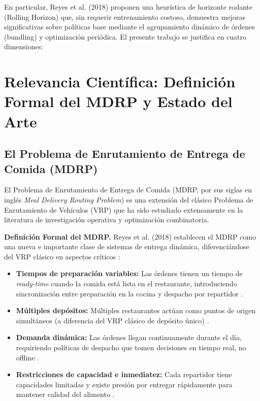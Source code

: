 En particular, Reyes et al. (2018) proponen una heurística de horizonte 
rodante (Rolling Horizon) que, sin requerir entrenamiento costoso, demuestra 
mejoras significativas sobre políticas base mediante el agrupamiento dinámico 
de órdenes (bundling) y optimización periódica. El presente trabajo se justifica 
en cuatro dimensiones:

\section{Relevancia Científica: Definición Formal del MDRP y Estado del Arte}

\subsection{El Problema de Enrutamiento de Entrega de Comida (MDRP)}

El Problema de Enrutamiento de Entrega de Comida (MDRP, por sus siglas 
en inglés \textit{Meal Delivery Routing Problem}) es una extensión del 
clásico Problema de Enrutamiento de Vehículos (VRP) que ha sido estudiado 
extensamente en la literatura de investigación operativa y optimización 
combinatoria.

\textbf{Definición Formal del MDRP.} Reyes et al. (2018) establecen el 
MDRP como una nueva e importante clase de sistemas de entrega dinámica, 
diferenciándose del VRP clásico en aspectos críticos \cite{Reyes2018}:

\begin{itemize}
    \item \textbf{Tiempos de preparación variables:} Las órdenes tienen un 
    tiempo de \textit{ready-time} cuando la comida está lista en el restaurante, 
    introduciendo sincronización entre preparación en la cocina y despacho 
    por repartidor \cite{Reyes2018}.
    
    \item \textbf{Múltiples depósitos:} Múltiples restaurantes actúan como 
    puntos de origen simultáneos (a diferencia del VRP clásico de depósito 
    único) \cite{Reyes2018}.
    
    \item \textbf{Demanda dinámica:} Las órdenes llegan continuamente durante 
    el día, requiriendo políticas de despacho que tomen decisiones en tiempo 
    real, no offline \cite{Reyes2018}.
    
    \item \textbf{Restricciones de capacidad e inmediatez:} Cada repartidor 
    tiene capacidades limitadas y existe presión por entregar rápidamente 
    para mantener calidad del alimento \cite{Reyes2018}.
\end{itemize}

